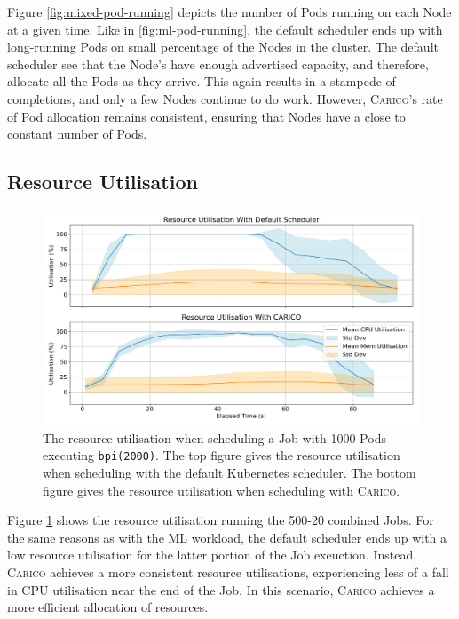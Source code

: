 Figure \ref{fig:mixed-pod-running} depicts the number of Pods running on each Node
at a given time. Like in \ref{fig:ml-pod-running}, the default scheduler ends up
with long-running Pods on small percentage of the Nodes in the cluster. The
default scheduler see that the Node's have enough advertised capacity, and
therefore, allocate all the Pods as they arrive. This again results in a
stampede of completions, and only a few Nodes continue to do work. However,
\textsc{Carico}'s rate of Pod allocation remains consistent, ensuring that Nodes have a
close to constant number of Pods.

\subsection{Resource Utilisation}

\begin{figure}[ht!]
    \centering
    \includegraphics[width=\textwidth]{images/mixed-util.png}
    \caption{The resource utilisation when scheduling a Job with 1000 Pods
    executing \texttt{bpi(2000)}. The top figure gives the resource utilisation
    when scheduling with the default Kubernetes scheduler. The bottom figure
    gives the resource utilisation when scheduling with \textsc{Carico}.}
    \label{fig:mixed-util}
\end{figure}

Figure \ref{fig:mixed-util} shows the resource utilisation running the 500-20
combined Jobs. For the same reasons as with the  ML workload, the default
scheduler ends up with a low resource utilisation for the
latter portion of the Job exeuction. Instead, \textsc{Carico} achieves a more consistent
resource utilisations, experiencing less of a fall in CPU utilisation near the
end of the Job. In this scenario, \textsc{Carico} achieves a more efficient allocation of
resources.

